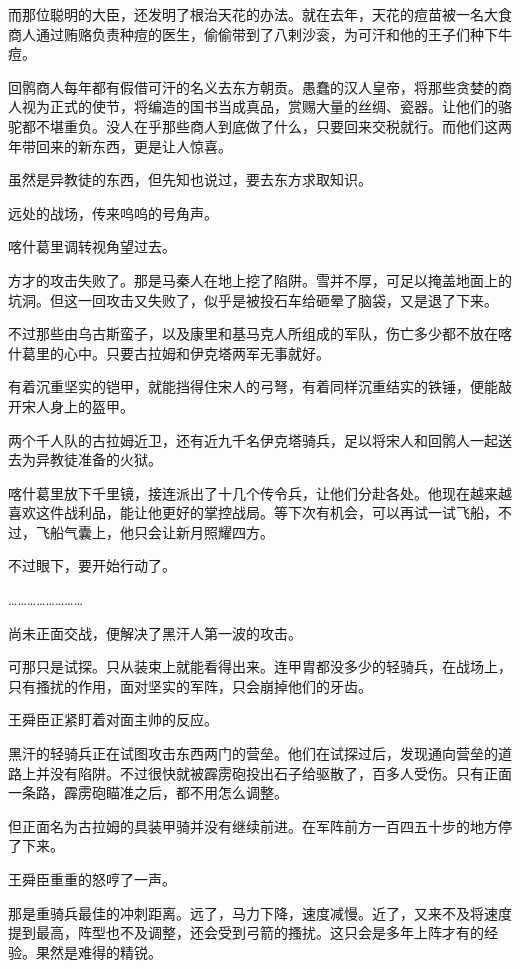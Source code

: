 而那位聪明的大臣，还发明了根治天花的办法。就在去年，天花的痘苗被一名大食商人通过贿赂负责种痘的医生，偷偷带到了八剌沙衮，为可汗和他的王子们种下牛痘。

回鹘商人每年都有假借可汗的名义去东方朝贡。愚蠢的汉人皇帝，将那些贪婪的商人视为正式的使节，将编造的国书当成真品，赏赐大量的丝绸、瓷器。让他们的骆驼都不堪重负。没人在乎那些商人到底做了什么，只要回来交税就行。而他们这两年带回来的新东西，更是让人惊喜。

虽然是异教徒的东西，但先知也说过，要去东方求取知识。

远处的战场，传来呜呜的号角声。

喀什葛里调转视角望过去。

方才的攻击失败了。那是马秦人在地上挖了陷阱。雪并不厚，可足以掩盖地面上的坑洞。但这一回攻击又失败了，似乎是被投石车给砸晕了脑袋，又是退了下来。

不过那些由乌古斯蛮子，以及康里和基马克人所组成的军队，伤亡多少都不放在喀什葛里的心中。只要古拉姆和伊克塔两军无事就好。

有着沉重坚实的铠甲，就能挡得住宋人的弓弩，有着同样沉重结实的铁锤，便能敲开宋人身上的盔甲。

两个千人队的古拉姆近卫，还有近九千名伊克塔骑兵，足以将宋人和回鹘人一起送去为异教徒准备的火狱。

喀什葛里放下千里镜，接连派出了十几个传令兵，让他们分赴各处。他现在越来越喜欢这件战利品，能让他更好的掌控战局。等下次有机会，可以再试一试飞船，不过，飞船气囊上，他只会让新月照耀四方。

不过眼下，要开始行动了。

……………………

尚未正面交战，便解决了黑汗人第一波的攻击。

可那只是试探。只从装束上就能看得出来。连甲胄都没多少的轻骑兵，在战场上，只有搔扰的作用，面对坚实的军阵，只会崩掉他们的牙齿。

王舜臣正紧盯着对面主帅的反应。

黑汗的轻骑兵正在试图攻击东西两门的营垒。他们在试探过后，发现通向营垒的道路上并没有陷阱。不过很快就被霹雳砲投出石子给驱散了，百多人受伤。只有正面一条路，霹雳砲瞄准之后，都不用怎么调整。

但正面名为古拉姆的具装甲骑并没有继续前进。在军阵前方一百四五十步的地方停了下来。

王舜臣重重的怒哼了一声。

那是重骑兵最佳的冲刺距离。远了，马力下降，速度减慢。近了，又来不及将速度提到最高，阵型也不及调整，还会受到弓箭的搔扰。这只会是多年上阵才有的经验。果然是难得的精锐。

